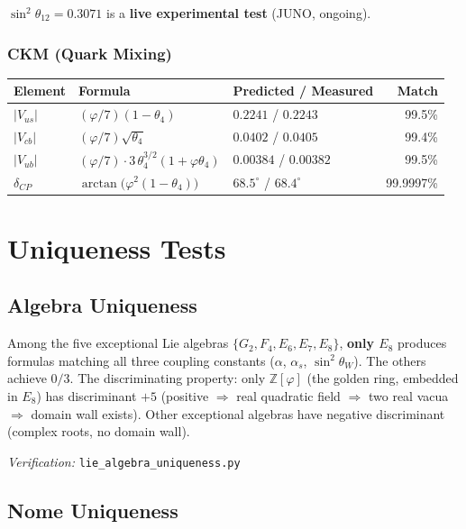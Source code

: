 \documentclass[11pt,a4paper]{article}
\newcommand{\vp}{\varphi}
\begin{document}
\noindent
$\sin^2\!\theta_{12} = 0.3071$ is a \textbf{live experimental test} (JUNO, ongoing).

\subsubsection{CKM (Quark Mixing)}

\begin{center}
\begin{tabular}{@{}lllr@{}}
\toprule
Element & Formula & Predicted / Measured & Match \\
\midrule
$|V_{us}|$ & $(\vp/7)(1-\theta_4)$ & $0.2241$ / $0.2243$ & 99.5\% \\
$|V_{cb}|$ & $(\vp/7)\sqrt{\theta_4}$ & $0.0402$ / $0.0405$ & 99.4\% \\
$|V_{ub}|$ & $(\vp/7)\cdot 3\,\theta_4^{3/2}(1+\vp\theta_4)$
  & $0.00384$ / $0.00382$ & 99.5\% \\
$\delta_{CP}$ & $\arctan\!\bigl(\vp^2(1-\theta_4)\bigr)$
  & $68.5^\circ$ / $68.4^\circ$ & 99.9997\% \\
\bottomrule
\end{tabular}
\end{center}

\section{Uniqueness Tests}
\label{sec:uniqueness}

\subsection{Algebra Uniqueness}

Among the five exceptional Lie algebras $\{G_2, F_4, E_6, E_7, E_8\}$,
\textbf{only $E_8$} produces formulas matching all three coupling constants
($\alpha$, $\alpha_s$, $\sin^2\!\theta_W$).  The others achieve $0/3$.
The discriminating property: only $\mathbb{Z}[\vp]$ (the golden ring, embedded
in $E_8$) has discriminant $+5$ (positive $\Rightarrow$ real quadratic field
$\Rightarrow$ two real vacua $\Rightarrow$ domain wall exists).  Other
exceptional algebras have negative discriminant (complex roots, no domain wall).

\emph{Verification:} \texttt{lie\_algebra\_uniqueness.py}

\subsection{Nome Uniqueness}
\end{document}
